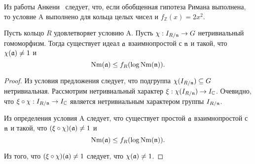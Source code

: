\documentclass[_00_dissertation.tex]{subfiles}
\begin{document}
\begin{remark}
    Из работы Анкени~\cite{source:Ankeny} следует, что, если обобщенная гипотеза Римана выполнена, то условие A выполнено для кольца целых чисел и $f_{\mathbb{Z}}(x) = 2x^2$.
\end{remark}

\begin{proposition}\label{proposition:condition_A_with_any_homomorphism}
    Пусть кольцо $R$ удовлетворяет условию A.
    Пусть $\chi: I_{R/\mathfrak{n}} \to G$ нетривиальный гомоморфизм.
    Тогда существует идеал $\mathfrak{a}$ взаимнопростой с $\mathfrak{n}$ и такой, что $\chi(\mathfrak{a}) \neq 1$ и
    \begin{equation*}
        \textrm{Nm}(\mathfrak{a}) \le f_R(\log{\textrm{Nm}(\mathfrak{n})}).
    \end{equation*}
\end{proposition}
\begin{proof}
    Из условия предложения следует, что подгруппа $\chi(I_{R/\mathfrak{n}}) \subseteq G$ нетривиальная.
    Рассмотрим нетривиальный характер $\xi: \chi(I_{R/\mathfrak{n}}) \to I_{\mathbb{C}}$.
    Очевидно, что $\xi \circ \chi: I_{R/\mathfrak{n}} \to I_{\mathbb{C}}$ является нетривиальным характером группы $I_{R/\mathfrak{n}}$.
    
    Из определения условия A следует, что существует простой $\mathfrak{a}$ взаимнопростой с $\mathfrak{n}$ и такой, что $(\xi \circ \chi)(\mathfrak{a}) \neq 1$ и
    \begin{equation*}
        \textrm{Nm}(\mathfrak{a}) \le f_R(\log{\textrm{Nm}(\mathfrak{n})}).
    \end{equation*}
    
    Из того, что $(\xi \circ \chi)(\mathfrak{a}) \neq 1$ следует, что $\chi(\mathfrak{a}) \neq 1$.
\end{proof}
\end{document}
